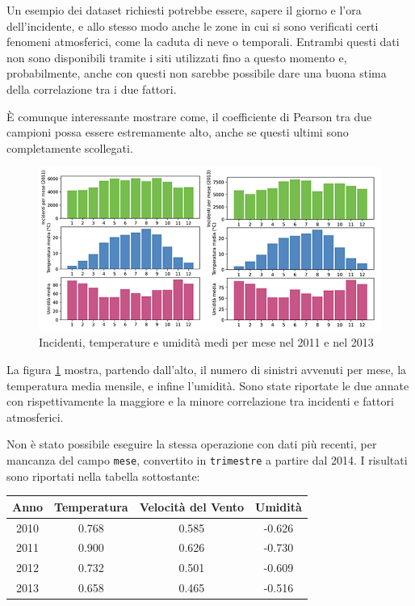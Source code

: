 \documentclass[a4paper,12pt]{report}
\newcommand{\columnstyle}[1]{\texttt{#1}}
\begin{document}
Un esempio dei dataset richiesti potrebbe essere, sapere il giorno e l'ora 
dell'incidente, e allo stesso modo anche le zone in cui si sono verificati certi 
fenomeni atmosferici, come la caduta di neve o temporali. 
Entrambi questi dati non sono disponibili tramite i siti utilizzati fino a questo momento e, 
probabilmente, anche con questi non sarebbe possibile dare una buona stima della correlazione 
tra i due fattori. 

\`E comunque interessante mostrare come, il coefficiente di Pearson tra due campioni 
possa essere estremamente alto, anche se questi ultimi sono completamente scollegati. 

\begin{figure}
    \includegraphics[width=\linewidth]{img_unite/temp_incidenti.png}
    \caption{Incidenti, temperature e umidità medi per mese nel 2011 e nel 2013}
    \label{fig:incidenti-temp}
\end{figure}

La figura \ref{fig:incidenti-temp} mostra, partendo dall'alto, il numero di sinistri 
avvenuti per mese, la temperatura media mensile, e infine l'umidità. 
Sono state riportate le due annate con rispettivamente la maggiore e la minore correlazione tra 
incidenti e fattori atmosferici. 

Non è stato possibile eseguire la stessa operazione con dati più recenti, per mancanza del 
campo \columnstyle{mese}, convertito in \columnstyle{trimestre} a partire dal 2014. 
I risultati sono riportati nella tabella sottostante: 

\begin{center}
    \def\arraystretch{1.5}%
    \begin{tabular}{ |c|c|c|c| } 
    \hline
    Anno & Temperatura & Velocità del Vento & Umidità \\ 
    \hline
    \rowcolor{TableGray}
    2010 & 0.768 & 0.585 & -0.626 \\
    2011 & 0.900 & 0.626 & -0.730 \\
    \rowcolor{TableGray}
    2012 & 0.732 & 0.501 & -0.609 \\
    2013 & 0.658 & 0.465 & -0.516 \\
    \hline
    \end{tabular}
\end{center}
\end{document}
